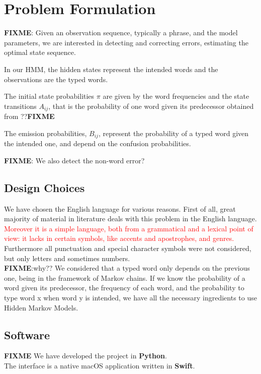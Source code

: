 \chapter{Problem Formulation} 

\textbf{FIXME}: Given an observation sequence, typically a phrase, and the model parameters, we are interested 
in detecting and correcting errors, estimating the optimal state sequence. 

In our HMM, the hidden states represent the intended words and the observations are the typed words. 

The initial state probabilities $\pi$ are given by the word frequencies and the state transitions $A_{ij}$, that is 
the probability of one word given its predecessor obtained from ??\textbf{FIXME}

The emission probabilities, $B_{ij}$, represent the probability of a typed word given the intended one, and 
depend on the confusion probabilities.

\textbf{FIXME}: We also detect the non-word error?

\section{Design Choices}

We have chosen the English language for various reasons. First of all, great majority of material in literature 
deals with this problem in the English language. \textcolor{red}{Moreover it is a simple language, both from a 
grammatical and a lexical point of view: it lacks in certain symbols, like accents and apostrophes, and genres. }
Furthermore all punctuation and special character symbols were not considered, but only letters and sometimes 
numbers. 
\\
\textbf{FIXME}:{why??}
We considered that a typed word only depends on the previous one, being in the framework of Markov chains. If 
we know the probability of a word given its predecessor, the frequency of each word, and the probability to type 
word x when word y is intended, we have all the necessary ingredients to use Hidden Markov Models.

\section{Software}
\textbf{FIXME}
We have developed the project in \textbf{Python}.\\
The interface is a native macOS application written in \textbf{Swift}.